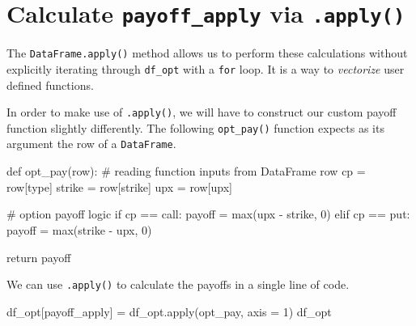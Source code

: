 \documentclass[
  letterpaper,
  DIV=11,
  numbers=noendperiod]{scrreprt}
\newenvironment{Shaded}{\begin{snugshade}}{\end{snugshade}}
\newcommand{\BuiltInTok}[1]{\textcolor[rgb]{0.00,0.23,0.31}{#1}}
\newcommand{\CommentTok}[1]{\textcolor[rgb]{0.37,0.37,0.37}{#1}}
\newcommand{\ControlFlowTok}[1]{\textcolor[rgb]{0.00,0.23,0.31}{#1}}
\newcommand{\DecValTok}[1]{\textcolor[rgb]{0.68,0.00,0.00}{#1}}
\newcommand{\KeywordTok}[1]{\textcolor[rgb]{0.00,0.23,0.31}{#1}}
\newcommand{\NormalTok}[1]{\textcolor[rgb]{0.00,0.23,0.31}{#1}}
\newcommand{\OperatorTok}[1]{\textcolor[rgb]{0.37,0.37,0.37}{#1}}
\newcommand{\StringTok}[1]{\textcolor[rgb]{0.13,0.47,0.30}{#1}}
\begin{document}
\hypertarget{calculate-payoff_apply-via-.apply}{%
\section{\texorpdfstring{Calculate \texttt{payoff\_apply} via
\texttt{.apply()}}{Calculate payoff\_apply via .apply()}}\label{calculate-payoff_apply-via-.apply}}

The \texttt{DataFrame.apply()} method allows us to perform these
calculations without explicitly iterating through \texttt{df\_opt} with
a \texttt{for} loop. It is a way to \emph{vectorize} user defined
functions.

In order to make use of \texttt{.apply()}, we will have to construct our
custom payoff function slightly differently. The following
\texttt{opt\_pay()} function expects as its argument the row of a
\texttt{DataFrame}.

\begin{Shaded}
\begin{Highlighting}[]
\KeywordTok{def}\NormalTok{ opt\_pay(row):}
    \CommentTok{\# reading function inputs from DataFrame row}
\NormalTok{    cp }\OperatorTok{=}\NormalTok{ row[}\StringTok{\textquotesingle{}type\textquotesingle{}}\NormalTok{]}
\NormalTok{    strike }\OperatorTok{=}\NormalTok{ row[}\StringTok{\textquotesingle{}strike\textquotesingle{}}\NormalTok{]}
\NormalTok{    upx }\OperatorTok{=}\NormalTok{ row[}\StringTok{\textquotesingle{}upx\textquotesingle{}}\NormalTok{]}
    
    \CommentTok{\# option payoff logic}
    \ControlFlowTok{if}\NormalTok{ cp }\OperatorTok{==} \StringTok{\textquotesingle{}call\textquotesingle{}}\NormalTok{:}
\NormalTok{        payoff }\OperatorTok{=} \BuiltInTok{max}\NormalTok{(upx }\OperatorTok{{-}}\NormalTok{ strike, }\DecValTok{0}\NormalTok{)}
    \ControlFlowTok{elif}\NormalTok{ cp }\OperatorTok{==} \StringTok{\textquotesingle{}put\textquotesingle{}}\NormalTok{:}
\NormalTok{        payoff }\OperatorTok{=} \BuiltInTok{max}\NormalTok{(strike }\OperatorTok{{-}}\NormalTok{ upx, }\DecValTok{0}\NormalTok{)}
    
    \ControlFlowTok{return}\NormalTok{ payoff}
\end{Highlighting}
\end{Shaded}

We can use \texttt{.apply()} to calculate the payoffs in a single line
of code.

\begin{Shaded}
\begin{Highlighting}[]
\NormalTok{df\_opt[}\StringTok{\textquotesingle{}payoff\_apply\textquotesingle{}}\NormalTok{] }\OperatorTok{=}\NormalTok{ df\_opt.}\BuiltInTok{apply}\NormalTok{(opt\_pay, axis }\OperatorTok{=} \DecValTok{1}\NormalTok{)}
\NormalTok{df\_opt}
\end{Highlighting}
\end{Shaded}
\end{document}
